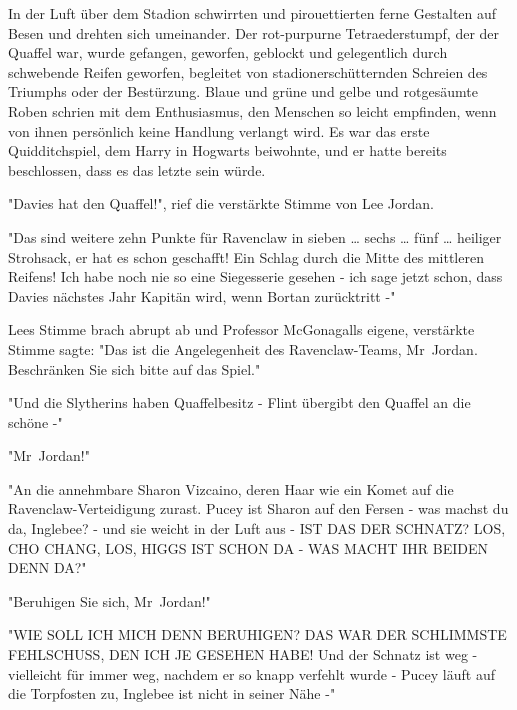 {In der Luft über dem Stadion schwirrten und pirouettierten ferne Gestalten auf Besen und drehten sich umeinander. Der rot-purpurne Tetraederstumpf, der der Quaffel war, wurde gefangen, geworfen, geblockt und gelegentlich durch schwebende Reifen geworfen, begleitet von stadionerschütternden Schreien des Triumphs oder der Bestürzung. Blaue und grüne und gelbe und rotgesäumte Roben schrien mit dem Enthusiasmus, den Menschen so leicht empfinden, wenn von ihnen persönlich keine Handlung verlangt wird. Es war das erste Quidditchspiel, dem Harry in Hogwarts beiwohnte, und er hatte bereits beschlossen, dass es das letzte sein würde.

"Davies hat den Quaffel!", rief die verstärkte Stimme von Lee Jordan.

"Das sind weitere zehn Punkte für Ravenclaw in sieben … sechs … fünf … heiliger Strohsack, er hat es schon geschafft! Ein Schlag durch die Mitte des mittleren Reifens! Ich habe noch nie so eine Siegesserie gesehen - ich sage jetzt schon, dass Davies nächstes Jahr Kapitän wird, wenn Bortan zurücktritt -"

Lees Stimme brach abrupt ab und Professor McGonagalls eigene, verstärkte Stimme sagte: "Das ist die Angelegenheit des Ravenclaw-Teams, Mr~Jordan. Beschränken Sie sich bitte auf das Spiel."

"Und die Slytherins haben Quaffelbesitz - Flint übergibt den Quaffel an die schöne -"

"Mr~Jordan!"

"An die annehmbare Sharon Vizcaino, deren Haar wie ein Komet auf die Ravenclaw-Verteidigung zurast. Pucey ist Sharon auf den Fersen - was machst du da, Inglebee? - und sie weicht in der Luft aus - IST DAS DER SCHNATZ? LOS, CHO CHANG, LOS, HIGGS IST SCHON DA - WAS MACHT IHR BEIDEN DENN DA?"

"Beruhigen Sie sich, Mr~Jordan!"

"WIE SOLL ICH MICH DENN BERUHIGEN? DAS WAR DER SCHLIMMSTE FEHLSCHUSS, DEN ICH JE GESEHEN HABE! Und der Schnatz ist weg - vielleicht für immer weg, nachdem er so knapp verfehlt wurde - Pucey läuft auf die Torpfosten zu, Inglebee ist nicht in seiner Nähe -"

}
